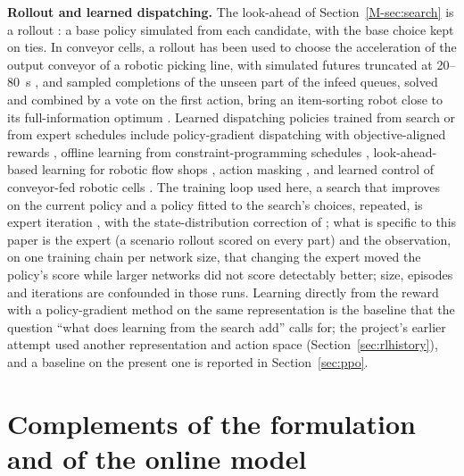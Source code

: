 \documentclass[11pt,a4paper]{article}
\theoremstyle{plain}
\theoremstyle{definition}
\theoremstyle{remark}
\begin{document}
\textbf{Rollout and learned dispatching.} The look-ahead of Section~\ref{M-sec:search} is a
rollout \cite{M02_Bertsekas1997}: a base policy simulated from each candidate, with the
base choice kept on ties. In conveyor cells, a rollout has been used to choose the
acceleration of the output conveyor of a robotic picking line, with simulated futures
truncated at 20--80~s \cite{Righettini2025}, and sampled completions of the unseen part of
the infeed queues, solved and combined by a vote on the first action, bring an item-sorting
robot close to its full-information optimum \cite{Li2026}. Learned dispatching policies trained from search or from expert
schedules include policy-gradient dispatching with objective-aligned rewards
\cite{S19_Zhang2020,S21_Sun2023}, offline learning from constraint-programming schedules
\cite{S20_VanRemmerden2025}, look-ahead-based learning for robotic flow shops
\cite{S14_Kim2023}, action masking \cite{M04_Huang2022,S18_Wei2024}, and learned control
of conveyor-fed robotic cells \cite{S15_Zisgen2025,S16_Drijver2023,S17_Drakaki2017,S12_Wang2004,S13_Li2020}.
The training loop used here, a search that improves on the current policy and a policy
fitted to the search's choices, repeated, is expert iteration \cite{Anthony2017,Silver2018},
with the state-distribution correction of \cite{Ross2011}; what is specific to this paper
is the expert (a scenario rollout scored on every part) and the observation, on one
training chain per network size, that changing the expert moved the policy's score while
larger networks did not score detectably better; size, episodes and iterations are confounded in
those runs. Learning directly from the reward with a
policy-gradient method \cite{Schulman2017} on the same representation is the baseline
that the question ``what does learning from the search add'' calls for; the project's
earlier attempt used another representation and action space (Section~\ref{sec:rlhistory}),
and a baseline on the present one is reported in Section~\ref{sec:ppo}.

\section{Complements of the formulation and of the online model}\label{sec:formdetails}
\end{document}
